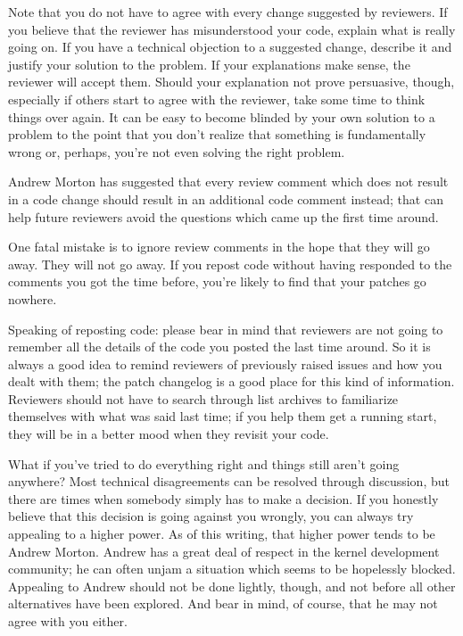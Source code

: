 \documentclass[a4paper,8pt,english]{sphinxmanual}
\begin{document}
Note that you do not have to agree with every change suggested by
reviewers.  If you believe that the reviewer has misunderstood your code,
explain what is really going on.  If you have a technical objection to a
suggested change, describe it and justify your solution to the problem.  If
your explanations make sense, the reviewer will accept them.  Should your
explanation not prove persuasive, though, especially if others start to
agree with the reviewer, take some time to think things over again.  It can
be easy to become blinded by your own solution to a problem to the point
that you don't realize that something is fundamentally wrong or, perhaps,
you're not even solving the right problem.

Andrew Morton has suggested that every review comment which does not result
in a code change should result in an additional code comment instead; that
can help future reviewers avoid the questions which came up the first time
around.

One fatal mistake is to ignore review comments in the hope that they will
go away.  They will not go away.  If you repost code without having
responded to the comments you got the time before, you're likely to find
that your patches go nowhere.

Speaking of reposting code: please bear in mind that reviewers are not
going to remember all the details of the code you posted the last time
around.  So it is always a good idea to remind reviewers of previously
raised issues and how you dealt with them; the patch changelog is a good
place for this kind of information.  Reviewers should not have to search
through list archives to familiarize themselves with what was said last
time; if you help them get a running start, they will be in a better mood
when they revisit your code.

What if you've tried to do everything right and things still aren't going
anywhere?  Most technical disagreements can be resolved through discussion,
but there are times when somebody simply has to make a decision.  If you
honestly believe that this decision is going against you wrongly, you can
always try appealing to a higher power.  As of this writing, that higher
power tends to be Andrew Morton.  Andrew has a great deal of respect in the
kernel development community; he can often unjam a situation which seems to
be hopelessly blocked.  Appealing to Andrew should not be done lightly,
though, and not before all other alternatives have been explored.  And bear
in mind, of course, that he may not agree with you either.
\end{document}
